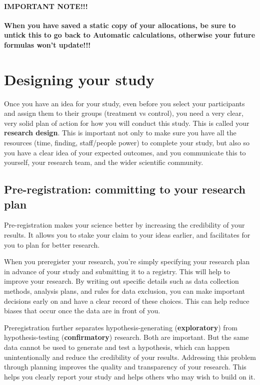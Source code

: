 \documentclass[
]{book}
\begin{document}
\hypertarget{important-note}{%
\paragraph{IMPORTANT NOTE!!!}\label{important-note}}

\textbf{When you have saved a static copy of your allocations, be sure to untick this to go back to Automatic calculations, otherwise your future formulas won't update!!!}

\hypertarget{designing-your-study}{%
\section{Designing your study}\label{designing-your-study}}

Once you have an idea for your study, even before you select your participants and assign them to their groups (treatment vs control), you need a very clear, very solid plan of action for how you will conduct this study. This is called your \textbf{research design}. This is important not only to make sure you have all the resources (time, finding, staff/people power) to complete your study, but also so you have a clear idea of your expected outcomes, and you communicate this to yourself, your research team, and the wider scientific community.

\hypertarget{pre-registration-committing-to-your-research-plan}{%
\subsection{Pre-registration: committing to your research plan}\label{pre-registration-committing-to-your-research-plan}}

Pre-registration makes your science better by increasing the credibility of your results. It allows you to stake your claim to your ideas earlier, and facilitates for you to plan for better research.

When you preregister your research, you're simply specifying your research plan in advance of your study and submitting it to a registry. This will help to improve your research. By writing out specific details such as data collection methods, analysis plans, and rules for data exclusion, you can make important decisions early on and have a clear record of these choices. This can help reduce biases that occur once the data are in front of you.

Preregistration further separates hypothesis-generating (\textbf{exploratory}) from hypothesis-testing (\textbf{confirmatory}) research. Both are important. But the same data cannot be used to generate and test a hypothesis, which can happen unintentionally and reduce the credibility of your results. Addressing this problem through planning improves the quality and transparency of your research. This helps you clearly report your study and helps others who may wish to build on it.
\end{document}
